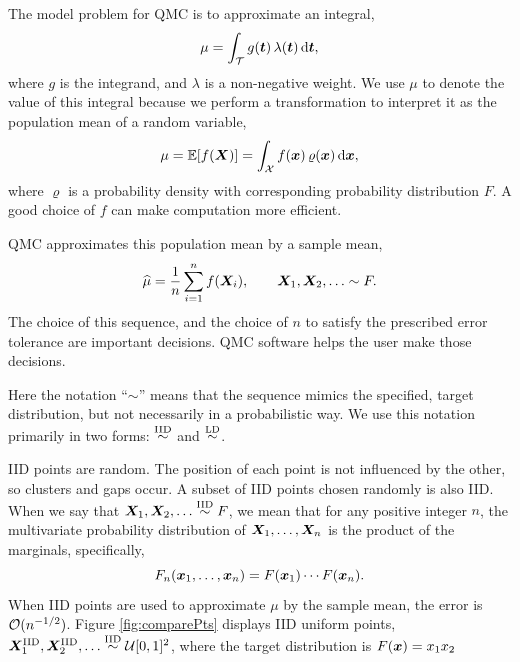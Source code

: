 \documentclass[graybox,footinfo]{svmult}
\newcommand{\hmu}{\widehat{\mu}}
\newcommand{\IID}{\textup{IID}}
\newcommand{\LD}{\textup{LD}}
\newcommand{\IIDsim}{\overset{\IID}{\sim}}
\newcommand{\LDsim}{\overset{\LD}{\sim}}
\begin{document}
The model problem for QMC is to approximate an integral,
\begin{equation} \label{eq:integral}
	\mu = \int_\calT g(\bst) \, \lambda(\bst) \, \D \bst,
\end{equation}
where $g$ is the integrand, and $\lambda$ is a non-negative weight.  We use $\mu$ to denote the value of this integral because we perform a transformation to interpret it as the population mean of a random variable, 
\begin{equation} \label{eq:fintegral}
	\mu = \bbE[f(\bsX)] = \int_\calX f(\bsx) \, \varrho(\bsx) \, \D \bsx,
\end{equation}
where $\varrho$ is a probability density with corresponding probability distribution $F$. 
A good choice of $f$ can make computation more efficient.

QMC approximates this population mean by a sample mean,
\begin{equation} \label{eq:samplemean}
	\hmu = \frac 1n \sum_{i=1}^n f(\bsX_i), \qquad \bsX_1, \bsX_2, \ldots \sim F.
\end{equation}
The choice of this sequence, and the choice of $n$ to satisfy  the prescribed error tolerance are important decisions.  QMC software helps the user make those decisions.

Here the notation ``$\sim$'' means that the sequence mimics the specified, target distribution, but not necessarily in a probabilistic way.  We  use this notation primarily  in two forms:  $\IIDsim$ and $\LDsim$.

IID points are random. The position of each point is not influenced by the other, so clusters and gaps occur.  A subset of IID points chosen randomly is also IID.  When we say that $\bsX_1, \bsX_2, \ldots \IIDsim F$, we mean that for any positive integer $n$, the  multivariate probability distribution of ${\boldsymbol{X}}_1, \ldots, {\boldsymbol{X}}_n$ is the product of the marginals, specifically,
\begin{equation*}
	F_{n}({\boldsymbol{x}}_1, \ldots, {\boldsymbol{x}}_n) = F({\boldsymbol{x}}_1) \cdots  F({\boldsymbol{x}}_n).
\end{equation*}
When IID points are used to approximate $\mu$ by the sample mean, the error is ${\mathcal{O}}(n^{-1/2})$.  Figure \ref{fig:comparePts} displays IID uniform points, $\bsX^{\IID}_1, \bsX^{\IID}_2, \ldots \IIDsim \calU[0,1]^2$, where the target distribution is $F({\boldsymbol{x}}) = x_1 x_2$
\end{document}
